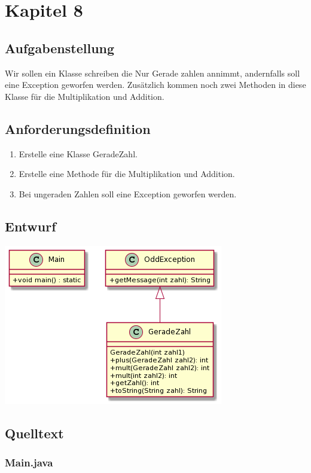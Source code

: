 \section{Kapitel 8}
\subsection{Aufgabenstellung}
Wir sollen ein Klasse schreiben die Nur Gerade zahlen annimmt, andernfalls soll eine Exception
geworfen werden. Zusätzlich kommen noch zwei Methoden in diese Klasse für 
die Multiplikation und Addition.

\subsection{Anforderungsdefinition}
\begin{enumerate}
	\item Erstelle eine Klasse GeradeZahl.
	\item Erstelle eine Methode für die Multiplikation und Addition.
	\item Bei ungeraden Zahlen soll eine Exception geworfen werden.
\end{enumerate}

\subsection{Entwurf}
\includegraphics[scale=0.55]{uml/uml_c8_p1.png}

\subsection{Quelltext}
\subsubsection{Main.java}

